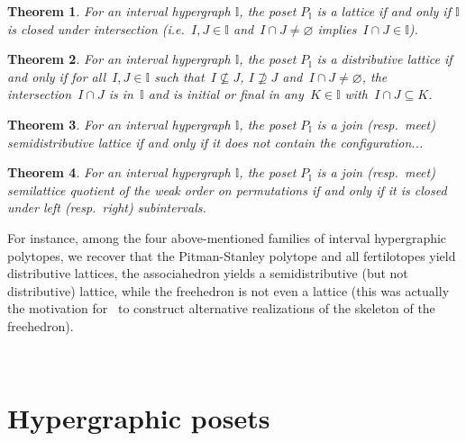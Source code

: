 \documentclass[reqno]{amsart}
\newtheorem{theoremA}{Theorem}
\theoremstyle{definition}
\newcommand{\ie}{\textit{i.e.}~} %
\newcommand{\vincent}[1]{\todo[size=\tiny,color=blue!30]{ #1 \\ \hfill --- V.}\,}
\newcommand{\II}{\mathbb I} %
\begin{document}
\begin{theoremA}
\label{thm:latticeI}
For an interval hypergraph $\II$, the poset $P_\II$ is a lattice if and only if $\II$ is closed under intersection (\ie $I, J \in \II$ and~$I \cap J \ne \varnothing$ implies~$I \cap J \in \II$).
\end{theoremA}

\begin{theoremA}
\label{thm:distributiveLatticeI}
For an interval hypergraph $\II$, the poset $P_\II$ is a distributive lattice if and only if for all~$I, J \in \II$ such that~$I \not\subseteq J$, $I \not\supseteq J$ and~$I \cap J \ne \varnothing$, the intersection~$I \cap J$ is in~$\II$ and is initial or final in any~$K \in \II$ with~$I \cap J \subseteq K$.
\end{theoremA}

\begin{theoremA}
\label{thm:semidistributiveLatticeI}
For an interval hypergraph $\II$, the poset $P_\II$ is a join (resp.~meet) semidistributive lattice if and only if it does not contain the configuration...
\vincent{todo}
\end{theoremA}

\begin{theoremA}
\label{thm:quotientLatticeI}
For an interval hypergraph $\II$, the poset $P_\II$ is a join (resp.~meet) semilattice quotient of the weak order on permutations if and only if it is closed under left (resp.~right) subintervals.
\end{theoremA}

For instance, among the four above-mentioned families of interval hypergraphic polytopes, we recover that  the Pitman-Stanley polytope and all fertilotopes yield distributive lattices, the associahedron yields a semidistributive (but not distributive) lattice, while the freehedron is not even a lattice (this was actually the motivation for~\cite{PilaudPoliakova} to construct alternative realizations of the skeleton of the freehedron).

\vincent{In progress}

\setcounter{theoremA}{0}


\pagebreak
\section{Hypergraphic posets}
\label{sec:HP}
\end{document}
